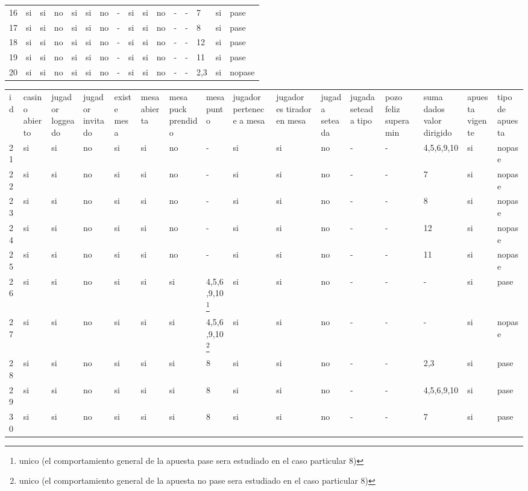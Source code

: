 \documentclass[a4paper, 10pt, notitlepage]{article}
\begin{document}
\begin{landscape}
\begin{tabularx}{1.5\textheight}{|X|X|X|X|X|X|X|X|X|X|X|X|X|X|X|X|}
16	&	si	&	si	&	no	&	si	&	si	&	no	&	-	&	si	&	si	&	no	&	-	&	-	&	7	&	si	&	pase\\
17	&	si	&	si	&	no	&	si	&	si	&	no	&	-	&	si	&	si	&	no	&	-	&	-	&	8	&	si	&	pase\\
18	&	si	&	si	&	no	&	si	&	si	&	no	&	-	&	si	&	si	&	no	&	-	&	-	&	12	&	si	&	pase\\
19	&	si	&	si	&	no	&	si	&	si	&	no	&	-	&	si	&	si	&	no	&	-	&	-	&	11	&	si	&	pase\\
20	&	si	&	si	&	no	&	si	&	si	&	no	&	-	&	si	&	si	&	no	&	-	&	-	&	2,3	&	si	&	nopase\\
\end{tabularx}
\vskip1cm
\end{landscape}

\begin{landscape}
\begin{tabularx}{1.5\textheight}{|X|X|X|X|X|X|X|X|X|X|X|X|X|X|X|X|}
id	&	casino abierto	&	jugador loggeado	&	jugador invitado	&	existe mesa	&	mesa abierta	&	mesa puck prendido	&	mesa punto	&	jugador pertenece a mesa	&	jugador es tirador en mesa	&	jugada seteada	&	jugada seteada tipo	&	pozo feliz supera min	&	suma dados
valor dirigido	&	apuesta vigente	&	tipo de apuesta\\	
21	&	si	&	si	&	no	&	si	&	si	&	no	&	-	&	si	&	si	&	no	&	-	&	-	&	4,5,6,9,10	&	si	&	nopase\\
22	&	si	&	si	&	no	&	si	&	si	&	no	&	-	&	si	&	si	&	no	&	-	&	-	&	7	&	si	&	nopase\\
23	&	si	&	si	&	no	&	si	&	si	&	no	&	-	&	si	&	si	&	no	&	-	&	-	&	8	&	si	&	nopase\\
24	&	si	&	si	&	no	&	si	&	si	&	no	&	-	&	si	&	si	&	no	&	-	&	-	&	12	&	si	&	nopase\\
25	&	si	&	si	&	no	&	si	&	si	&	no	&	-	&	si	&	si	&	no	&	-	&	-	&	11	&	si	&	nopase\\
26	&	si	&	si	&	no	&	si	&	si	&	si	&	4,5,6,9,10\footnote{unico (el comportamiento general de la apuesta pase sera estudiado en el caso particular 8)}	&	si	&	si	&	no	&	-	&	-	&	-	&	si	&	pase\\
27	&	si	&	si	&	no	&	si	&	si	&	si	&	4,5,6,9,10\footnote{unico (el comportamiento general de la apuesta no pase sera estudiado en el caso particular 8)}	&	si	&	si	&	no	&	-	&	-	&	-	&	si	&	nopase\\
28	&	si	&	si	&	no	&	si	&	si	&	si	&	8	&	si	&	si	&	no	&	-	&	-	&	2,3	&	si	&	pase\\
29	&	si	&	si	&	no	&	si	&	si	&	si	&	8	&	si	&	si	&	no	&	-	&	-	&	4,5,6,9,10	&	si	&	pase\\
30	&	si	&	si	&	no	&	si	&	si	&	si	&	8	&	si	&	si	&	no	&	-	&	-	&	7	&	si	&	pase\\

\end{tabularx}
\end{landscape}
\end{document}
